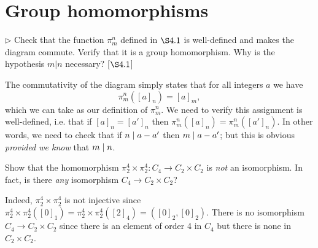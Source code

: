 \section{Group homomorphisms}
\extitle
\begin{exercise}
	$\triangleright$ Check that the function $\pi^n_m$ defined in $\S 4.1$ is well-defined and makes the diagram commute. Verify that it is a group homomorphism. Why is the hypothesis $m|n$ necessary? [$\S 4.1$]
\end{exercise}
\begin{solution}
	 The commutativity of the diagram simply states that for all integers $a$ we have 
	 \[
	 	\pi_m^n ([a]_n) = [a]_m,
	 \]
	 which we can take as our definition of $\pi_m^n$. We need to verify this assignment is well-defined, i.e. that if $[a]_n = [a']_n$ then $\pi_m^n([a]_n) = \pi_m^n([a']_n)$. In other words, we need to check that if $n\mid a-a'$ then $m\mid a-a'$; but this is obvious \emph{provided we know} that $m\mid n$. 
\end{solution}

\begin{exercise}
	Show that the homomorphism $\pi_2^4 \times \pi_2^4\colon C_4 \to C_2 \times C_2$ is \emph{not} an isomorphism. In fact, is there \emph{any} isomorphism $C_4\to C_2\times C_2$?
\end{exercise}
\begin{solution}
	Indeed, $\pi_2^4 \times \pi_2^4$ is not injective since \hbox{$\pi_2^4 \times \pi_2^4([0]_1) = \pi_2^4 \times \pi_2^4([2]_4) = ([0]_2,[0]_2)$}. There is no isomorphism $C_4 \to C_2\times C_2$ since there is an element of order 4 in $C_4$ but there is none in $C_2\times C_2$.
\end{solution}

